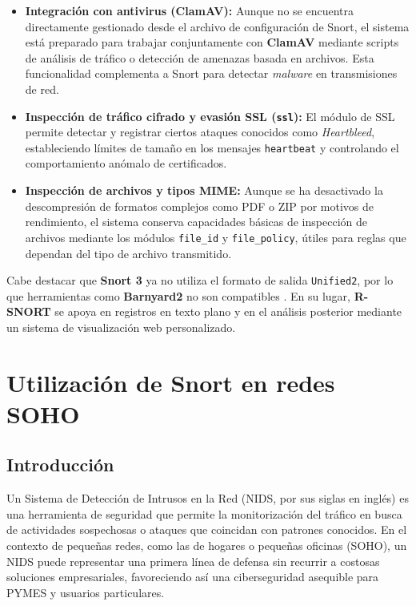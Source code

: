 \documentclass[11pt,a4paper,twoside]{report}
\begin{document}
\begin{itemize}
	\item \textbf{Integración con antivirus (ClamAV):}  
	Aunque no se encuentra directamente gestionado desde el archivo de configuración de Snort, el sistema está preparado para trabajar conjuntamente con \textbf{ClamAV} mediante scripts de análisis de tráfico o detección de amenazas basada en archivos. Esta funcionalidad complementa a Snort para detectar \textit{malware} en transmisiones de red.
	
	\item \textbf{Inspección de tráfico cifrado y evasión SSL (\texttt{ssl}):}  
	El módulo de SSL permite detectar y registrar ciertos ataques conocidos como \textit{Heartbleed}, estableciendo límites de tamaño en los mensajes \texttt{heartbeat} y controlando el comportamiento anómalo de certificados.
	
	\item \textbf{Inspección de archivos y tipos MIME:}  
	Aunque se ha desactivado la descompresión de formatos complejos como PDF o ZIP por motivos de rendimiento, el sistema conserva capacidades básicas de inspección de archivos mediante los módulos \texttt{file\_id} y \texttt{file\_policy}, útiles para reglas que dependan del tipo de archivo transmitido.
\end{itemize}

Cabe destacar que \textbf{Snort 3} ya no utiliza el formato de salida \texttt{Unified2}, por lo que herramientas como \textbf{Barnyard2} no son compatibles \cite{snort_gui_update}. En su lugar, \textbf{R-SNORT} se apoya en registros en texto plano y en el análisis posterior mediante un sistema de visualización web personalizado.

\clearpage
\null
\thispagestyle{empty}
\newpage
\chapter{Utilización de Snort en redes SOHO}
\section{Introducción}

Un Sistema de Detección de Intrusos en la Red (NIDS, por sus siglas en inglés) es una herramienta de seguridad que permite la monitorización del tráfico en busca de actividades sospechosas o ataques que coincidan con patrones conocidos. En el contexto de pequeñas redes, como las de hogares o pequeñas oficinas (SOHO), un NIDS puede representar una primera línea de defensa sin recurrir a costosas soluciones empresariales, favoreciendo así una ciberseguridad asequible para PYMES y usuarios particulares.\newline
\end{document}

